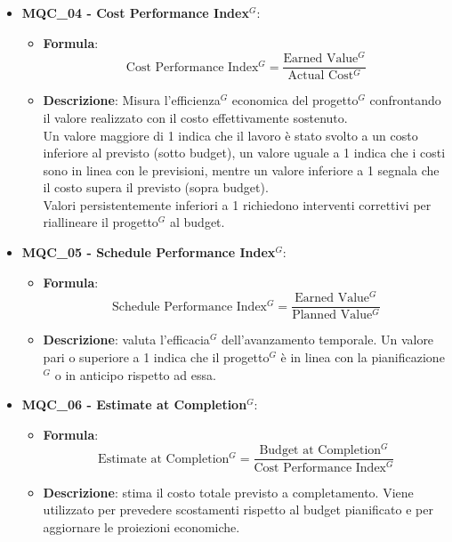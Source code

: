 \begin{itemize}
\item \textbf{MQC\_04 - Cost Performance Index$^G$}:
    \begin{itemize}
        \item \textbf{Formula}:
        \[
            \text{Cost Performance Index$^G$} =
            \frac{\text{Earned Value$^G$}}{\text{Actual Cost$^G$}}
        \]
        \item \textbf{Descrizione}: 
        Misura l'efficienza$^G$ economica del progetto$^G$ confrontando il valore realizzato con il costo effettivamente sostenuto.\\
        Un valore maggiore di 1 indica che il lavoro è stato svolto a un costo inferiore al previsto (sotto budget), un valore uguale a 1 indica che i costi sono in linea con le previsioni, mentre un valore inferiore a 1 segnala che il costo supera il previsto (sopra budget). \\
        Valori persistentemente inferiori a 1 richiedono interventi correttivi per riallineare il progetto$^G$ al budget.
    \end{itemize}

\item \textbf{MQC\_05 - Schedule Performance Index$^G$}:
    \begin{itemize}
        \item \textbf{Formula}:
        \[
            \text{Schedule Performance Index$^G$} =
            \frac{\text{Earned Value$^G$}}{\text{Planned Value$^G$}}
        \]
        \item \textbf{Descrizione}: valuta l’efficacia$^G$ dell’avanzamento temporale. Un valore pari o superiore a 1 indica che il progetto$^G$ è in linea con la pianificazione$^G$ o in anticipo rispetto ad essa.
    \end{itemize}

\item \textbf{MQC\_06 - Estimate at Completion$^G$}:
    \begin{itemize}
        \item \textbf{Formula}:
        \[
            \text{Estimate at Completion$^G$} = 
            \frac{\text{Budget at Completion$^G$}}{\text{Cost Performance Index$^G$}}
        \]
        \item \textbf{Descrizione}: stima il costo totale previsto a completamento. Viene utilizzato per prevedere scostamenti rispetto al budget pianificato e per aggiornare le proiezioni economiche.
    \end{itemize}


\end{itemize}
